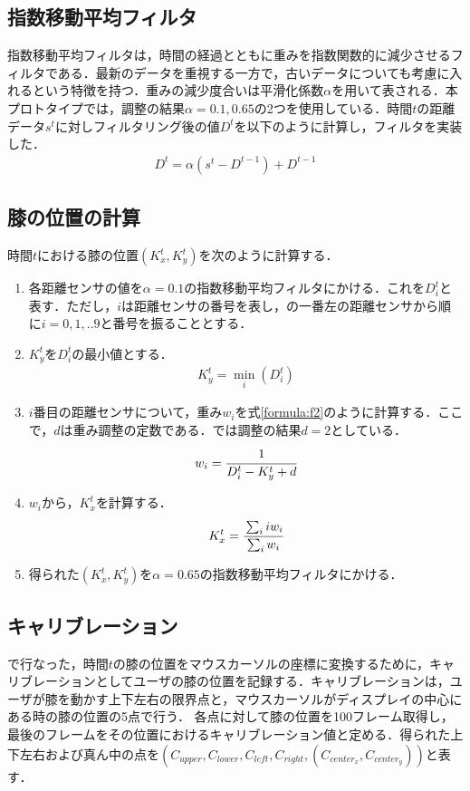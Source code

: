 \subsection{指数移動平均フィルタ}
指数移動平均フィルタは，時間の経過とともに重みを指数関数的に減少させるフィルタである．最新のデータを重視する一方で，古いデータについても考慮に入れるという特徴を持つ．重みの減少度合いは平滑化係数$\alpha$を用いて表される．本プロトタイプでは，調整の結果$\alpha = 0.1, 0.65$の2つを使用している．時間$t$の距離データ$s^t$に対しフィルタリング後の値$D^t$を以下のように計算し，フィルタを実装した．
\begin{eqnarray}
	D^t = \alpha (s^t - D^{t-1}) + D^{t-1}
\end{eqnarray}
\subsection{膝の位置の計算}
時間$t$における膝の位置$(K^t_x, K^t_y)$を次のように計算する．
\begin{enumerate}
	\item 各距離センサの値を$\alpha=0.1$の指数移動平均フィルタにかける．これを$D^t_i$と表す．ただし，$i$は距離センサの番号を表し，の一番左の距離センサから順に$i=0,1,..9$と番号を振ることとする．
	\item $K^t_y$を$D^t_i $の最小値とする．
		\begin{eqnarray}
		 	K^t_y = \min_i(D^t_i)
		 	\label{formula:f1}
		\end{eqnarray}
	\item $i$番目の距離センサについて，重み$w_i$を式\ref{formula:f2}のように計算する．ここで，$d$は重み調整の定数である．\SysName では調整の結果$d=2$としている．
		\begin{eqnarray}
			w_i = \cfrac{1}{D^t_i - K^t_y + d}
		\label{formula:f2}
	\end{eqnarray}
	\item $w_i$から，$K^t_x$を計算する．
		\begin{eqnarray}
		 	 K^t_x=\cfrac{\sum_i iw_i}{\sum_i w_i}
		 	\label{formula:f3}
		\end{eqnarray} 
	\item 得られた$(K^t_x, K^t_y)$を$\alpha=0.65$の指数移動平均フィルタにかける．
\end{enumerate}
\subsection{キャリブレーション}
で行なった，時間$t$の膝の位置をマウスカーソルの座標に変換するために，キャリブレーションとしてユーザの膝の位置を記録する．キャリブレーションは，ユーザが膝を動かす上下左右の限界点と，マウスカーソルがディスプレイの中心にある時の膝の位置の5点で行う．
各点に対して膝の位置を100フレーム取得し，最後のフレームをその位置におけるキャリブレーション値と定める．得られた上下左右および真ん中の点を$(C_{upper}, C_{lower}, C_{left}, C_{right}, (C_{center_x}, C_{center_y}))$と表す．
